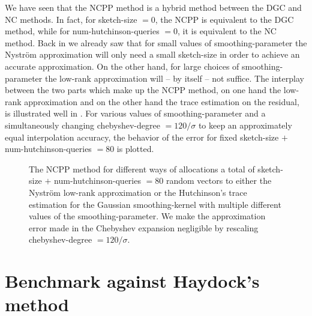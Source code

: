 We have seen that the \gls{NCPP} method is a hybrid method between the \gls{DGC} and \gls{NC} methods.
In fact, for \gls{sketch-size} $=0$, the \gls{NCPP} is equivalent to the \gls{DGC}
method, while for \gls{num-hutchinson-queries} $=0$, it is equivalent to the \gls{NC} method.
Back in  we already saw that for small values of \gls{smoothing-parameter}
the Nystr\"om approximation will only need a small \gls{sketch-size} in order
to achieve an accurate approximation. On the other hand, for large choices of
\gls{smoothing-parameter} the low-rank approximation will -- by itself -- not suffice.
The interplay between the two parts which make up the \gls{NCPP} method,
on one hand the low-rank approximation and on the other hand the
trace estimation on the residual, is illustrated well in
.
For various values of \gls{smoothing-parameter} and a simultaneously changing
\gls{chebyshev-degree} $=120 / \sigma$ to keep an approximately equal interpolation
accuracy, the behavior of the error for fixed \gls{sketch-size} $+$ \gls{num-hutchinson-queries} $=80$ is plotted.

\begin{figure}[ht]
    \centering
    
    \caption{The \gls{NCPP} method for different ways of allocations a 
    total of \gls{sketch-size} $+$ \gls{num-hutchinson-queries} $=80$ random vectors
    to either the Nystr\"om low-rank approximation or the Hutchinson's trace estimation
    for the Gaussian \gls{smoothing-kernel} with multiple different values of
    the \gls{smoothing-parameter}. We make the approximation error made in the
    Chebyshev expansion negligible by rescaling \gls{chebyshev-degree} $=120 / \sigma$.}
    \label{fig:5-experiments-electronic-structure-matvec-mixture}
\end{figure}


\clearpage
\section{Benchmark against Haydock's method}
\label{sec:5-experiments-haydock-method}


